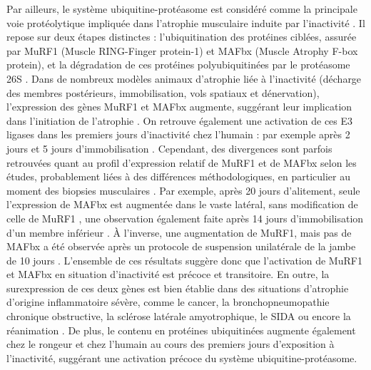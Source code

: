 \documentclass[11pt]{report}
\begin{document}
Par ailleurs, le système ubiquitine-protéasome est considéré comme la principale voie protéolytique impliquée dans l'atrophie musculaire induite par l'inactivité \parencite{Scicchitano2015,bosutti_microgravity-induced_2025}. Il repose sur deux étapes distinctes : l'ubiquitination des protéines ciblées, assurée par MuRF1 (Muscle RING-Finger protein-1) et MAFbx (Muscle Atrophy F-box protein), et la dégradation de ces protéines polyubiquitinées par le protéasome 26S \parencite{Bodine2014Aug}. Dans de nombreux modèles animaux d'atrophie liée à l'inactivité (décharge des membres postérieurs, immobilisation, vols spatiaux et dénervation), l'expression des gènes MuRF1 et MAFbx augmente, suggérant leur implication dans l'initiation de l'atrophie \parencite{Gao2018Mar}. On retrouve également une activation de ces E3 ligases dans les premiers jours d'inactivité chez l'humain : par exemple après 2 jours \parencite{Suetta2012,Abadi2009Aug} et 5 jours d'immobilisation \parencite{Dirks2014Mar}. Cependant, des divergences sont parfois retrouvées quant au profil d'expression relatif de MuRF1 et de MAFbx selon les études, probablement liées à des différences méthodologiques, en particulier au moment des biopsies musculaires \parencite{Bodine2014Aug}. Par exemple, après 20 jours d'alitement, seule l'expression de MAFbx est augmentée dans le vaste latéral, sans modification de celle de MuRF1 \parencite{Ogawa2006Oct}, une observation également faite après 14 jours d'immobilisation d'un membre inférieur \parencite{Jones2004Jun}. À l'inverse, une augmentation de MuRF1, mais pas de MAFbx a été observée après un protocole de suspension unilatérale de la jambe de 10 jours \parencite{deBoer2007Nov}. L'ensemble de ces résultats suggère donc que l'activation de MuRF1 et MAFbx en situation d'inactivité est précoce et transitoire. En outre, la surexpression de ces deux gènes est bien établie dans des situations d'atrophie d'origine inflammatoire sévère, comme le cancer, la bronchopneumopathie chronique obstructive, la sclérose latérale amyotrophique, le SIDA ou encore la réanimation \parencite{Murton2008Dec}. De plus, le contenu en protéines ubiquitinées augmente également chez le rongeur \parencite{Salaun2016Jan} et chez l'humain \parencite{Glover2010Apr,brocca_time_2012} au cours des premiers jours d'exposition à l'inactivité, suggérant une activation précoce du système ubiquitine-protéasome.
\end{document}
